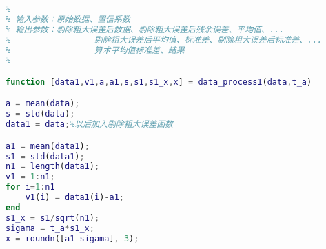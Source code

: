 \newpage
\begin{lstlisting}[language=Matlab]
% 等精度测量数据误差分析
%
% 输入参数：原始数据、置信系数
% 输出参数：剔除粗大误差后数据、剔除粗大误差后残余误差、平均值、...
%                 剔除粗大误差后平均值、标准差、剔除粗大误差后标准差、...
%                 算术平均值标准差、结果
%

function [data1,v1,a,a1,s,s1,s1_x,x] = data_process1(data,t_a)

a = mean(data);
s = std(data);
data1 = data;%以后加入剔除粗大误差函数

a1 = mean(data1);
s1 = std(data1);
n1 = length(data1);
v1 = 1:n1;
for i=1:n1
	v1(i) = data1(i)-a1;
end
s1_x = s1/sqrt(n1);
sigama = t_a*s1_x;
x = roundn([a1 sigama],-3);
\end{lstlisting}

